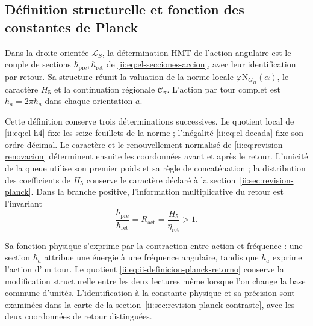 \subsection{Définition structurelle et fonction des constantes de Planck}
\label{ii:sec:ii-definicion-planck}

\begin{definition}
Dans la droite orientée \(\mathcal L_S\), la détermination HMT de
l'action angulaire est le couple de sections
\(\hbar_{\mathrm{pre}},\hbar_{\mathrm{ret}}\) de
\eqref{ii:eq:el-secciones-accion}, avec leur identification par retour.
Sa structure réunit la valuation de la norme locale
\(\varphi\mathrm N_{G_H}(\alpha)\), le caractère \(H_5\) et la
continuation régionale \(\mathcal C_\pi\). L'action par tour complet
est \(h_a=2\pi\hbar_a\) dans chaque orientation \(a\).
\end{definition}

Cette définition conserve trois déterminations successives. Le quotient
local de \eqref{ii:eq:el-h4} fixe les seize feuillets de la norme ;
l'inégalité \eqref{ii:eq:el-decada} fixe son ordre décimal. Le caractère et
le renouvellement normalisé de \eqref{ii:eq:revision-renovacion} déterminent
ensuite les coordonnées avant et après le retour. L'unicité de la queue
utilise son premier poids et sa règle de concaténation ; la distribution des
coefficients de \(H_5\) conserve le caractère déclaré à la
section~\ref{ii:sec:revision-planck}. Dans la branche positive, l'information
multiplicative du retour est l'invariant
\begin{equation}
 \frac{\hbar_{\mathrm{pre}}}{\hbar_{\mathrm{ret}}}
 =R_{\mathrm{act}}=\frac{H_5}{\eta_{\mathrm{ret}}}>1.
 \label{ii:eq:ii-definicion-planck-retorno}
\end{equation}

Sa fonction physique s'exprime par la contraction entre action et
fréquence : une section \(\hbar_a\) attribue une énergie à une fréquence
angulaire, tandis que \(h_a\) exprime l'action d'un tour. Le quotient
\eqref{ii:eq:ii-definicion-planck-retorno} conserve la modification
structurelle entre les deux lectures même lorsque l'on change la base commune
d'unités. L'identification à la constante physique et sa précision
sont examinées dans la carte de la section~\ref{ii:sec:revision-planck-contraste},
avec les deux coordonnées de retour distinguées.
